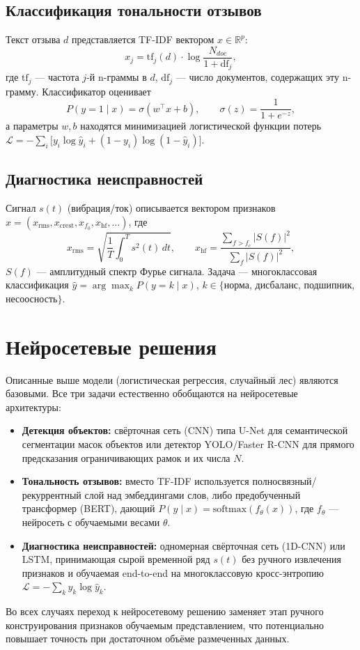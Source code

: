 \documentclass[12pt]{article}
\begin{document}
\subsection{Классификация тональности отзывов}

Текст отзыва $d$ представляется TF-IDF вектором $x \in \mathbb{R}^p$:
\begin{equation}
  x_j = \mathrm{tf}_j(d) \cdot \log\frac{N_{doc}}{1+\mathrm{df}_j},
\end{equation}
где $\mathrm{tf}_j$ — частота $j$-й n-граммы в $d$, $\mathrm{df}_j$ — число
документов, содержащих эту n-грамму. Классификатор оценивает
\begin{equation}
  P(y=1\mid x) = \sigma(w^\top x + b), \qquad \sigma(z) = \frac{1}{1+e^{-z}},
\end{equation}
а параметры $w, b$ находятся минимизацией логистической функции потерь
$\mathcal{L} = -\sum_i \big[y_i\log \hat y_i + (1-y_i)\log(1-\hat y_i)\big]$.

\subsection{Диагностика неисправностей}

Сигнал $s(t)$ (вибрация/ток) описывается вектором признаков
$x = (x_{\mathrm{rms}}, x_{\mathrm{crest}}, x_{f_0}, x_{\mathrm{hf}}, \dots)$, где
\begin{equation}
  x_{\mathrm{rms}} = \sqrt{\frac{1}{T}\int_0^T s^2(t)\,dt}, \qquad
  x_{\mathrm{hf}} = \frac{\sum_{f>f_c} |S(f)|^2}{\sum_{f} |S(f)|^2},
\end{equation}
$S(f)$ — амплитудный спектр Фурье сигнала. Задача — многоклассовая
классификация $\hat y = \arg\max_{k} P(y=k\mid x)$, $k\in\{$норма, дисбаланс,
подшипник, несоосность$\}$.

\section{Нейросетевые решения}

Описанные выше модели (логистическая регрессия, случайный лес) являются
базовыми. Все три задачи естественно обобщаются на нейросетевые архитектуры:

\begin{itemize}
  \item \textbf{Детекция объектов:} свёрточная сеть (CNN) типа U-Net для
        семантической сегментации масок объектов или детектор YOLO/Faster R-CNN
        для прямого предсказания ограничивающих рамок и их числа $N$.
  \item \textbf{Тональность отзывов:} вместо TF-IDF используется
        полносвязный/рекуррентный слой над эмбеддингами слов, либо
        предобученный трансформер (BERT), дающий $P(y\mid x) = \mathrm{softmax}(f_\theta(x))$,
        где $f_\theta$ — нейросеть с обучаемыми весами $\theta$.
  \item \textbf{Диагностика неисправностей:} одномерная свёрточная сеть
        (1D-CNN) или LSTM, принимающая сырой временной ряд $s(t)$ без
        ручного извлечения признаков и обучаемая end-to-end на
        многоклассовую кросс-энтропию
        $\mathcal{L} = -\sum_k y_k \log \hat y_k$.
\end{itemize}

Во всех случаях переход к нейросетевому решению заменяет этап ручного
конструирования признаков обучаемым представлением, что потенциально
повышает точность при достаточном объёме размеченных данных.
\end{document}
